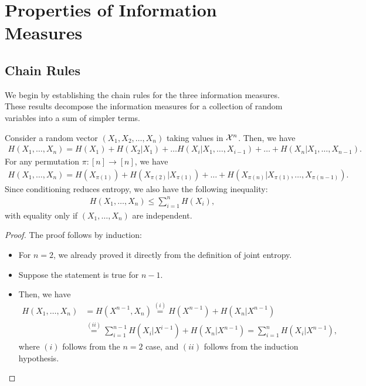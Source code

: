         \section{Properties of Information Measures}

            \subsection{Chain Rules} We begin by establishing the chain rules for the three information measures. These results decompose the information measures for a collection of random variables into a sum of simpler terms. 
            
            \begin{theorem}
                \label{thm:chain-rule-ent}
                Consider a random vector $(X_1, X_2, \ldots, X_n)$ taking values in $\mathcal{X}^n$. Then, we have 
                \begin{align}
                    H(X_1, \ldots, X_n) = H(X_1) + H(X_2|X_1) + \ldots H(X_i|X_1, \ldots, X_{i-1}) + \ldots + H(X_n|X_1, \ldots, X_{n-1}). 
                \end{align}
                For any permutation $\pi:[n] \to [n]$, we have  
                \begin{align}
                    H(X_1, \ldots, X_n) = H(X_{\pi(1)}) + H(X_{\pi(2)}|X_{\pi(1)}) + \ldots + H(X_{\pi(n)}|X_{\pi(1)}, \ldots, X_{\pi(n-1)}). 
                \end{align}
                Since conditioning reduces entropy, we also have the following inequality: 
                \begin{align}
                H(X_1, \ldots, X_n) \leq \sum_{i=1}^n H(X_i), 
                \end{align}
                with equality only if $(X_1, \ldots, X_n)$ are independent. 
            \end{theorem}

            \begin{proof}
                The proof follows by induction: 
                \begin{itemize}
                    \item For $n=2$, we already proved it directly from the definition of joint entropy. 
                    \item Suppose the statement is true for $n-1$. 
                    \item Then, we have 
                    \begin{align}
                        H(X_1, \ldots, X_n) &= H(X^{n-1}, X_n)  \stackrel{(i)}{=}H(X^{n-1}) + H(X_n|X^{n-1}) \\
                        &\stackrel{(ii)}{=} \sum_{i=1}^{n-1} H(X_i|X^{i-1}) + H(X_n|X^{n-1}) = \sum_{i=1}^n H(X_i|X^{n-1}), 
                    \end{align}
                    where $(i)$ follows from the $n=2$ case, and $(ii)$ follows from the induction hypothesis. 
                \end{itemize}
            \end{proof}


